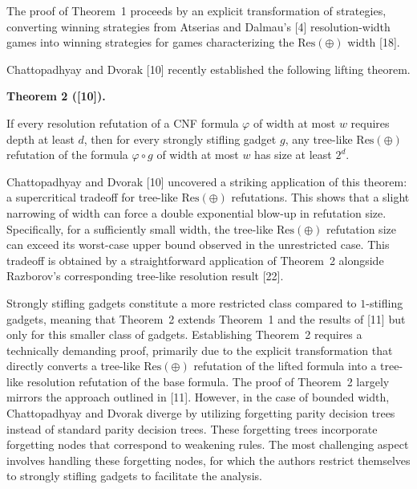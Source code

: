 \documentclass[10pt,a4paper]{article}
\begin{document}
The proof of Theorem 1 proceeds by an explicit transformation of strategies, converting winning strategies from Atserias and Dalmau’s [4] resolution-width games into winning strategies for games characterizing the $\mathrm{Res}(\oplus)$ width [18].\par



Chattopadhyay and Dvorak [10] recently established the following lifting theorem.\par



\par\medskip\noindent\textbf{
Theorem 2 ([10]).
}\par



If every resolution refutation of a CNF formula $\varphi$ of width at most $w$ requires depth at least $d$, then for every strongly stifling gadget $g$, any tree-like $\mathrm{Res}(\oplus)$ refutation of the formula
$\varphi\circ g$ of width at most $w$ has size at least $2^{d}$.\par




Chattopadhyay and Dvorak [10] uncovered a striking application of this theorem: a supercritical tradeoff for tree-like $\mathrm{Res}(\oplus)$ refutations. This shows that a slight narrowing of width can force a double exponential blow-up in refutation size. Specifically, for a sufficiently small width, the tree-like $\mathrm{Res}(\oplus)$ refutation size can exceed its worst-case upper bound observed in the unrestricted case. This tradeoff is obtained by a straightforward application of Theorem 2 alongside Razborov’s corresponding tree-like resolution result [22].\par



Strongly stifling gadgets constitute a more restricted class compared to $1$-stifling gadgets, meaning that Theorem 2 extends Theorem 1 and the results of [11] but only for this smaller class of gadgets. Establishing Theorem 2 requires a technically demanding proof, primarily due to the explicit transformation that directly converts a tree-like $\mathrm{Res}(\oplus)$ refutation of the lifted formula into a tree-like resolution refutation of the base formula. The proof of Theorem 2 largely mirrors the approach outlined in [11]. However, in the case of bounded width, Chattopadhyay and Dvorak diverge by utilizing forgetting parity decision trees instead of standard parity decision trees. These forgetting trees incorporate forgetting nodes that correspond to weakening rules. The most challenging aspect involves handling these forgetting nodes, for which the authors restrict themselves to strongly stifling gadgets to facilitate the analysis.\par
\end{document}

